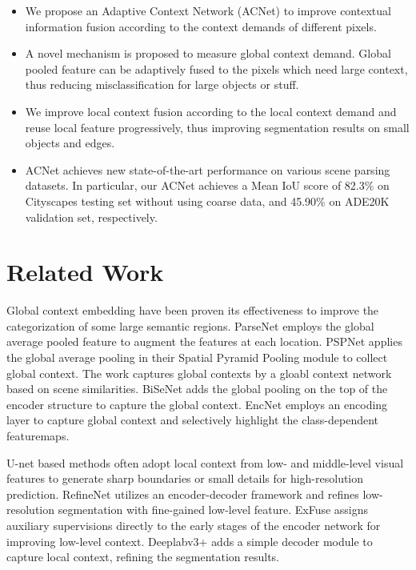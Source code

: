 \documentclass[10pt,twocolumn,letterpaper]{article}
\begin{document}
\begin{itemize}
   \item We propose an Adaptive Context Network (ACNet) to improve contextual information fusion according to the context demands of different pixels.

   \item A novel mechanism  is proposed to measure  global context demand. Global pooled feature can be  adaptively fused to the pixels which need large context, thus reducing misclassification for large objects or stuff. 

   \item We improve  local context fusion according to the local context demand and reuse local feature progressively, thus improving segmentation results on small objects and edges. 

   \item ACNet achieves new state-of-the-art performance on various scene parsing datasets. In particular, our ACNet achieves a Mean IoU score of 82.3\% on Cityscapes testing set without using coarse data, and 45.90\% on ADE20K validation set, respectively.

\end{itemize}


\section{Related Work}
 Global context embedding have been proven its effectiveness to improve the categorization of some large semantic regions. ParseNet \cite{parsenet} employs  the global average pooled feature to augment the features at each location.  
PSPNet \cite{pspnet} applies the global average pooling in their Spatial Pyramid Pooling module to collect global context.  The work \cite{hung2017scene} captures  global contexts by a gloabl context network based on scene similarities.
 BiSeNet  \cite{yu2018bisenet} adds the global pooling on the top of the encoder structure to capture the global context. EncNet \cite{encnet} employs an encoding layer to capture global context and selectively highlight the class-dependent featuremaps.

  U-net based methods often adopt local context from  low- and middle-level visual features to generate sharp boundaries or small details for high-resolution prediction.
RefineNet \cite{refinenet}  utilizes an encoder-decoder framework and refines low-resolution segmentation with fine-gained low-level feature. ExFuse \cite{exfuse}  assigns auxiliary supervisions directly to the early stages of the encoder network for improving low-level context. Deeplabv3+ \cite{chen2018encoder} 
adds a simple  decoder module to capture local context, refining the segmentation results.
\end{document}
